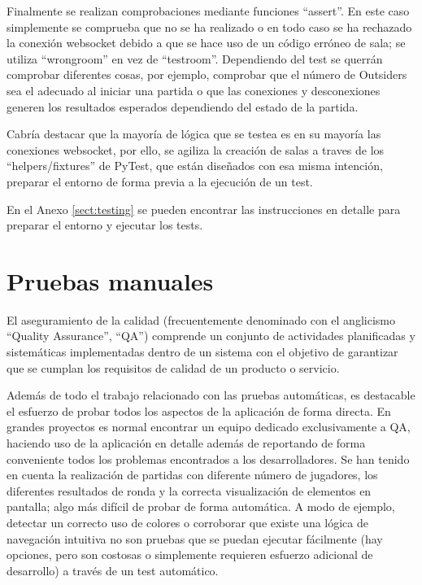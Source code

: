 Finalmente se realizan comprobaciones mediante funciones ``assert''. En este caso simplemente se comprueba que no se ha realizado
o en todo caso se ha rechazado la conexión websocket debido a que se hace uso de un código erróneo de sala; se utiliza ``wrong\textunderscore room''
en vez de ``test\textunderscore room''. Dependiendo del test se querrán comprobar diferentes cosas, por ejemplo, comprobar que el número de Outsiders sea
el adecuado al iniciar una partida o que las conexiones y desconexiones generen los resultados esperados dependiendo del estado de la partida.

Cabría destacar que la mayoría de lógica que se testea es en su mayoría las conexiones websocket, por ello, se agiliza la creación de salas
a traves de los ``helpers/fixtures'' de PyTest, que están diseñados con esa misma intención, preparar el entorno de forma previa a la ejecución de 
un test. 

En el Anexo \ref{sect:testing} se pueden encontrar las instrucciones en detalle para preparar el entorno y ejecutar los tests.



\section{Pruebas manuales}

El aseguramiento de la calidad (frecuentemente denominado con el anglicismo ``Quality Assurance'', ``QA'') comprende un conjunto de actividades planificadas 
y sistemáticas implementadas dentro de un sistema con el objetivo de garantizar que se cumplan los requisitos de calidad 
de un producto o servicio.

Además de todo el trabajo relacionado con las pruebas automáticas, es destacable el esfuerzo de probar todos los aspectos de la aplicación
de forma directa. En grandes proyectos es normal encontrar un equipo dedicado exclusivamente a QA, haciendo uso de la aplicación en detalle
además de reportando de forma conveniente todos los problemas encontrados a los desarrolladores. Se han tenido en cuenta la realización de partidas
con diferente número de jugadores, los diferentes resultados de ronda y la correcta visualización de elementos en pantalla; algo más difícil de 
probar de forma automática. A modo de ejemplo, detectar un correcto uso de colores o corroborar que existe una lógica de navegación intuitiva no son pruebas 
que se puedan ejecutar fácilmente (hay opciones, pero son costosas o simplemente requieren esfuerzo adicional de desarrollo) a través de un test automático.

